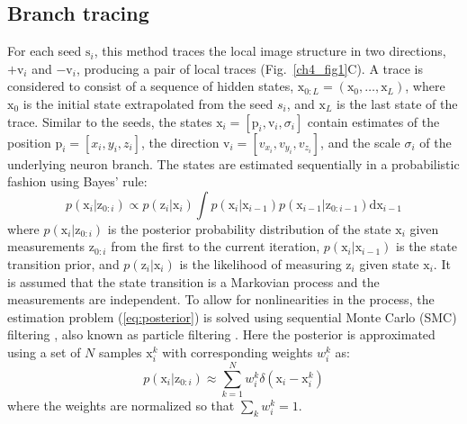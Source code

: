 \subsection{Branch tracing}
\label{subsec:branch-tracing}
For each seed $\mathrm{s}_i$, this method traces the local image structure in two directions, $+\mathrm{v}_i$ and $-\mathrm{v}_i$, producing a pair of local traces (Fig.~\ref{ch4_fig1}C). A trace is considered to consist of a sequence of hidden states, $\mathrm{x}_{0:L} = (\mathrm{x}_0,\dots,\mathrm{x}_L)$, where $\mathrm{x}_0$ is the initial state extrapolated from the seed $s_i$, and $\mathrm{x}_L$ is the last state of the trace. Similar to the seeds, the states $\mathrm{x}_i = \left[ \mathrm{p}_i, \mathrm{v}_i, \sigma_i \right]$ contain estimates of the position $\mathrm{p}_i = \left[ x_i, y_i, z_i  \right]$, the direction $\mathrm{v}_i = \left[ v_{x_i}, v_{y_i}, v_{z_i} \right]$, and the scale $\sigma_i$ of the underlying neuron branch. The states are estimated sequentially in a probabilistic fashion using Bayes' rule:
\begin{equation}
p(\mathrm{x}_i | \mathrm{z}_{0:i}) \propto  p(\mathrm{z}_i | \mathrm{x}_i) \!\!\int\!\! p(\mathrm{x}_i | \mathrm{x}_{i-1}) p(\mathrm{x}_{i-1} | \mathrm{z}_{0:i-1}) \mathrm{dx}_{i-1}
\label{eq:posterior}
\end{equation}
where $p(\mathrm{x}_i | \mathrm{z}_{0:i})$ is the posterior probability distribution of the state $\mathrm{x}_i$ given measurements $\mathrm{z}_{0:i}$ from the first to the current iteration, $p(\mathrm{x}_i | \mathrm{x}_{i-1})$ is the state transition prior, and $p(\mathrm{z}_i | \mathrm{x}_i)$ is the likelihood of measuring $\mathrm{z}_i$ given state $\mathrm{x}_i$. It is assumed that the state transition is a Markovian process and the measurements are independent. To allow for nonlinearities in the process, the estimation problem (\ref{eq:posterior}) is solved using sequential Monte Carlo (SMC) filtering \cite{doucet2001introduction}, also known as particle filtering \cite{arulampalam2002tutorial}. Here the posterior is approximated using a set of $N$ samples $\mathrm{x}_{i}^k$ with corresponding weights $w_i^k$ as:
\begin{equation}
p(\mathrm{x}_i | \mathrm{z}_{0:i}) \approx \sum_{k=1}^{N} w_i^k \delta(\mathrm{x}_i - \mathrm{x}_i^k)
\label{eq:approx}
\end{equation}
where the weights are normalized so that $\sum_k w_i^k = 1$.

